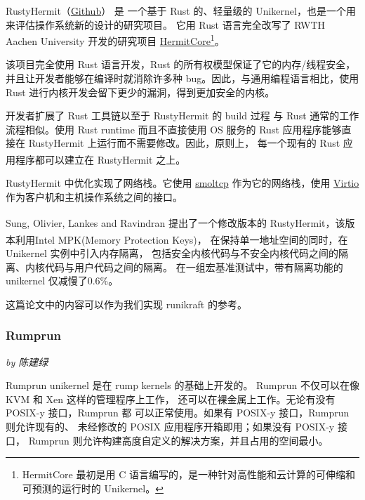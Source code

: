 \documentclass[UTF8,fontset=none,linespread=1.15]{ctexart}
\let\nosupcite\cite
\renewcommand*{\cite}[1]{\textsuperscript{\nosupcite{#1}}}
\newcommand{\sectionauthor}[1]{%
\vspace*{-5ex}
\noindent\textrm{\hfill\textit{by #1}}
\vspace*{2ex}\par}
\begin{document}
RustyHermit（\href{https://github.com/hermitcore/rusty-hermit}{Github}） 是
一个基于 Rust 的、轻量级的 Unikernel，也是一个用来评估操作系统新的设计的研究项目。
它用 Rust 语言完全改写了 RWTH Aachen University
 开发的研究项目 \href{http://hermitcore.org/}{HermitCore}\footnote{HermitCore 最初是用 C 语言编写的，是一种针对高性能和云计算的可伸缩和可预测的运行时的 Unikernel。}。\cite{bib:14-rusty-hermit}

该项目完全使用 Rust 语言开发，Rust 的所有权模型保证了它的内存/线程安全，
并且让开发者能够在编译时就消除许多种 bug。因此，与通用编程语言相比，使用 Rust
 进行内核开发会留下更少的漏洞，得到更加安全的内核。

开发者扩展了 Rust 工具链以至于 RustyHermit 的 build 过程
与 Rust 通常的工作流程相似。使用 Rust runtime 而且不直接使用 OS 服务的
 Rust 应用程序能够直接在 RustyHermit 上运行而不需要修改。因此，原则上，
 每一个现有的 Rust 应用程序都可以建立在 RustyHermit 之上。\cite{bib:17-rusty-hermit2}


RustyHermit 中优化实现了网络栈。它使用 \href{https://github.com/smoltcp-rs/smoltcp}{smoltcp}
作为它的网络栈，使用 \href{https://www.linux-kvm.org/page/Virtio}{Virtio}
作为客户机和主机操作系统之间的接口。
%

Sung, Olivier, Lankes and Ravindran\cite{bib:18-intra-unikernel}
提出了一个修改版本的 RustyHermit，该版本利用Intel MPK(Memory Protection Keys)\cite{bib:19-mpk}，
在保持单一地址空间的同时，在 Unikernel 实例中引入内存隔离，
包括安全内核代码与不安全内核代码之间的隔离、内核代码与用户代码之间的隔离。
在一组宏基准测试中，带有隔离功能的 unikernel 仅减慢了0.6\%。

这篇论文中的内容可以作为我们实现 runikraft 的参考。

\subsubsection{Rumprun}\sectionauthor{陈建绿}

Rumprun unikernel 是在 rump kernels 的基础上开发的。
Rumprun 不仅可以在像 KVM 和 Xen 这样的管理程序上工作，
还可以在裸金属上工作。无论有没有 POSIX-y 接口，Rumprun 都
可以正常使用。如果有 POSIX-y 接口，Rumprun 则允许现有的、
未经修改的 POSIX 应用程序开箱即用；如果没有 POSIX-y 接口，
Rumprun 则允许构建高度自定义的解决方案，并且占用的空间最小。
\end{document}
